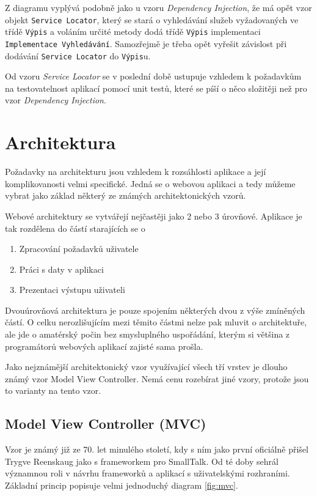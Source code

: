 \documentclass[11pt,twoside,a4paper]{book}
\begin{document}
Z diagramu vyplývá podobně jako u vzoru \textit{Dependency Injection}, že má opět vzor objekt \texttt{Service Locator}, který se stará o vyhledávání služeb vyžadovaných ve třídě \texttt{Výpis} a voláním určité metody dodá třídě \texttt{Výpis} implementaci \texttt{Implementace Vyhledávání}. Samozřejmě je třeba opět vyřešit závislost při dodávání \texttt{Service Locator} do \texttt{Výpis}u. 

Od vzoru \textit{Service Locator} se v poslední době ustupuje vzhledem k požadavkům na testovatelnost aplikací pomocí unit testů, které se píší o něco složitěji než pro vzor \textit{Dependency Injection}. 




\section{Architektura}
Požadavky na architekturu jsou vzhledem k rozsáhlosti aplikace a její komplikovanosti velmi specifické. Jedná se o webovou aplikaci a tedy můžeme vybrat jako základ některý ze známých architektonických vzorů. 

Webové architektury se vytvářejí nejčastěji jako 2 nebo 3 úrovňové. Aplikace je tak rozdělena do částí starajících se o 

\begin{enumerate}
\item Zpracování požadavků uživatele
\item Práci s daty v aplikaci
\item Prezentaci výstupu uživateli
\end{enumerate}

Dvouúrovňová architektura je pouze spojením některých dvou z výše zmíněných částí. O celku nerozlišujícím mezi těmito částmi nelze pak mluvit o architektuře, ale jde o amatérský počin bez smysluplného uspořádání, kterým si většina z programátorů webových aplikací zajisté sama prošla.

Jako nejznámější architektonický vzor využívající všech tří vrstev je dlouho známý vzor Model View Controller. Nemá cenu rozebírat jiné vzory, protože jsou to varianty na tento vzor.

\subsection{Model View Controller (MVC)}
\label{mvc}
Vzor je známý již ze 70. let minulého století, kdy s ním jako první oficiálně přišel Trygve Reenskaug jako s frameworkem pro SmallTalk. Od té doby sehrál významnou roli v návrhu frameworků a aplikací s uživatelskými rozhraními\citep{PEAA}. Základní princip popisuje velmi jednoduchý diagram \ref{fig:mvc}.
\end{document}
